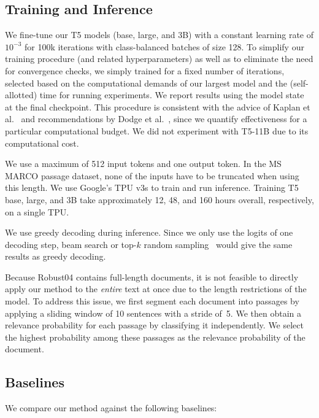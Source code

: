 \documentclass{article}
\begin{document}
\subsection{Training and Inference}
\label{section:training-and-inference}

We fine-tune our T5 models (base, large, and 3B) with a constant learning rate of $10^{-3}$ for 100k iterations with class-balanced batches of size 128.
To simplify our training procedure (and related hyperparameters) as well as to eliminate the need for convergence checks, we simply trained for a fixed number of iterations, selected based on the computational demands of our largest model and the (self-allotted) time for running experiments.
We report results using the model state at the final checkpoint.
This procedure is consistent with the advice of Kaplan et al.~\cite{Kaplan:2001.08361:2020} and recommendations by Dodge et al.~\cite{dodge2019show}, since we quantify effectiveness for a particular computational budget.
We did not experiment with T5-11B due to its computational cost.

We use a maximum of 512 input tokens and one output token. 
In the MS MARCO passage dataset, none of the inputs have to be truncated when using this length.
We use Google's TPU v3s to train and run inference.
Training T5 base, large, and 3B take approximately 12, 48, and 160 hours overall, respectively, on a single TPU.

We use greedy decoding during inference. 
Since we only use the logits of one decoding step, beam search or top-$k$ random sampling~\cite{fan2018hierarchical} would give the same results as greedy decoding.

Because Robust04 contains full-length documents, it is not feasible to directly apply our method to the {\it entire} text at once due to the length restrictions of the model.
To address this issue, we first segment each document into passages by applying a sliding window of 10 sentences with a stride of~5.
We then obtain a relevance probability for each passage by classifying it independently.
We select the highest probability among these passages as the relevance probability of the document.


\subsection{Baselines}
\label{section:retrieval-models}

We compare our method against the following baselines:
\end{document}
